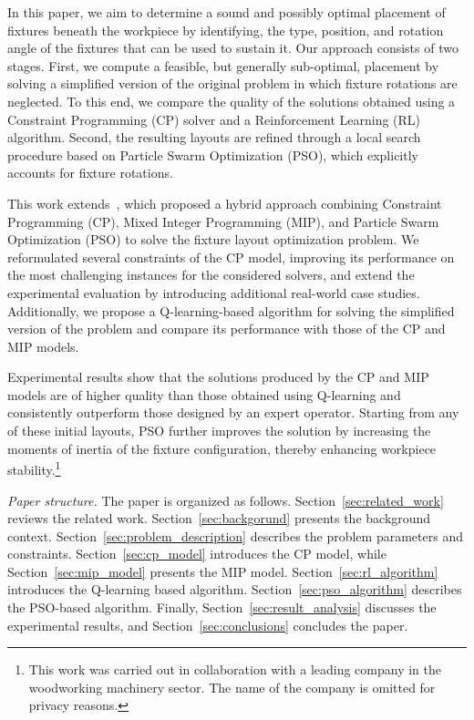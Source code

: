In this paper, we aim to determine a sound and possibly optimal placement of fixtures beneath the workpiece by identifying, the type, position, and rotation angle of the fixtures that can be used to sustain it. Our approach consists of two stages. First, we compute a feasible, but generally sub-optimal, placement by solving a simplified version of the original problem in which fixture rotations are neglected. To this end, we compare the quality of the solutions obtained using a Constraint Programming (CP) solver and a Reinforcement Learning (RL) algorithm. Second, the resulting layouts are refined through a local search procedure based on Particle Swarm Optimization (PSO), which explicitly accounts for fixture rotations.

This work extends~\cite{vitali2026constraint}, which proposed a hybrid approach combining Constraint Programming (CP), Mixed Integer Programming (MIP), and Particle Swarm Optimization (PSO) to solve the fixture layout optimization problem.  We reformulated several constraints of the CP model, improving its performance on the most challenging instances for the considered solvers, and extend the experimental evaluation by introducing additional real-world case studies. Additionally, we propose a Q-learning-based algorithm for solving the simplified version of the problem and compare its performance with those of the CP and MIP models.

Experimental results show that the solutions produced by the CP and MIP models are of higher quality than those obtained using Q-learning and consistently outperform those designed by an expert operator. Starting from any of these initial layouts, PSO further improves the solution by increasing the moments of inertia of the fixture configuration, thereby enhancing workpiece stability.\footnote{This work was carried out in collaboration with a leading company in the woodworking machinery sector. The name of the company is omitted for privacy reasons.}

\emph{Paper structure.} The paper is organized as follows. Section~\ref{sec:related_work} reviews the related work. Section~\ref{sec:backgorund} presents the background context.  Section~\ref{sec:problem_description} describes the problem parameters and constraints. Section~\ref{sec:cp_model} introduces the CP model, while Section~\ref{sec:mip_model} presents the MIP model. Section~\ref{sec:rl_algorithm} introduces the Q-learning based algorithm. Section~\ref{sec:pso_algorithm} describes the PSO-based algorithm. Finally, Section~\ref{sec:result_analysis} discusses the experimental results, and Section~\ref{sec:conclusions} concludes the paper.